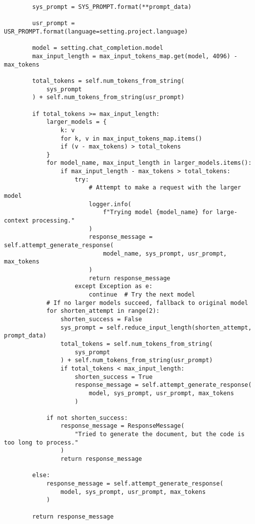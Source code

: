 \begin{verbatim}
        sys_prompt = SYS_PROMPT.format(**prompt_data)

        usr_prompt = USR_PROMPT.format(language=setting.project.language)

        model = setting.chat_completion.model
        max_input_length = max_input_tokens_map.get(model, 4096) - max_tokens

        total_tokens = self.num_tokens_from_string(
            sys_prompt
        ) + self.num_tokens_from_string(usr_prompt)

        if total_tokens >= max_input_length:
            larger_models = {
                k: v
                for k, v in max_input_tokens_map.items()
                if (v - max_tokens) > total_tokens
            }  
            for model_name, max_input_length in larger_models.items():
                if max_input_length - max_tokens > total_tokens:
                    try:
                        # Attempt to make a request with the larger model
                        logger.info(
                            f"Trying model {model_name} for large-context processing."
                        )
                        response_message = self.attempt_generate_response(
                            model_name, sys_prompt, usr_prompt, max_tokens
                        )  
                        return response_message
                    except Exception as e:
                        continue  # Try the next model
            # If no larger models succeed, fallback to original model
            for shorten_attempt in range(2):
                shorten_success = False
                sys_prompt = self.reduce_input_length(shorten_attempt, prompt_data)
                total_tokens = self.num_tokens_from_string(
                    sys_prompt
                ) + self.num_tokens_from_string(usr_prompt)
                if total_tokens < max_input_length:
                    shorten_success = True
                    response_message = self.attempt_generate_response(
                        model, sys_prompt, usr_prompt, max_tokens
                    )

            if not shorten_success:
                response_message = ResponseMessage(
                    "Tried to generate the document, but the code is too long to process."
                )
                return response_message

        else: 
            response_message = self.attempt_generate_response(
                model, sys_prompt, usr_prompt, max_tokens
            )

        return response_message
\end{verbatim}


